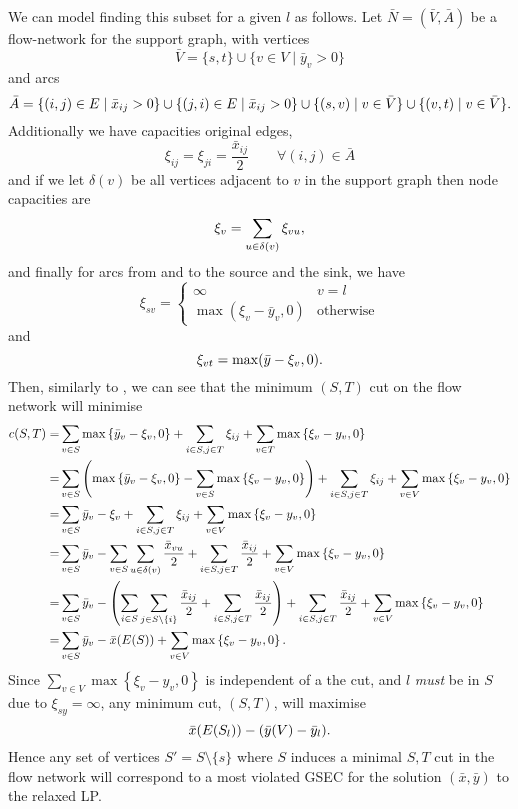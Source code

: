   We can model finding this subset for a given $l$ as follows. Let $\bar{N} = (\bar{V}, \bar{A})$ be a flow-network
  for the support graph, with vertices
  $$\bar V = \{s, t\} \cup \{v \in V \mid \bar y_v > 0 \}$$
  and arcs
  $$\bar A = \{(i, j) \in E \mid \bar x_{ij} > 0 \} \cup \{(j, i) \in E \mid \bar x_{ij} > 0\} \cup \{(s, v) \mid v \in \bar V\} \cup \{(v, t) \mid v \in \bar V\}\mathnormal{.}$$
  Additionally we have capacities original edges,
  $$\xi_{ij} = \xi_{ji} = \frac{\bar x_{ij}}{2} \qquad \forall (i,j) \in \bar A$$
  and if we let $\delta (v)$ be all vertices adjacent to $v$ in the support graph then node capacities are
  $$\xi_v = \sum_{u \in \delta(v)} \xi_{vu}\mathnormal{,}$$
  and finally
  for arcs from and to the source and the sink, we have
  $$\xi_{sv} =
  \begin{cases}
    \infty & v = l \\
    \max(\xi_v - \bar y_v, 0) & \text{otherwise}
  \end{cases}$$
  and
  $$\xi_{vt} = \max(\bar y - \xi_v, 0)\mathnormal{.}$$
  Then, similarly to \citet{padberg1983trees}, we can see that
  the minimum $(S,T)$ cut on the flow network will minimise
  \begin{align*}
    c(S,T) = &\sum_{v \in S} \max \left\{\bar y_v - \xi_v, 0\right\} +
               \sum_{i \in S, j \in T} \xi_{ij} +
               \sum_{v \in T} \max\left\{\xi_v - y_v, 0\right\} \\
    =&\sum_{v \in S} \left( \max \left\{\bar y_v - \xi_v, 0\right\} - \sum_{v \in S} \max\left\{\xi_v - y_v, 0\right\} \right) +
       \sum_{i \in S, j \in T}  \xi_{ij} +
       \sum_{v \in V} \max\left\{\xi_v - y_v, 0\right\} \\
    =&\sum_{v \in S} \bar y_v - \xi_v +
       \sum_{i \in S, j \in T} \xi_{ij} +
       \sum_{v \in V} \max\left\{\xi_v - y_v, 0\right\} \\
    =&\sum_{v \in S} \bar y_v -
       \sum_{v \in S} \sum_{u \in \delta(v)} \frac{\bar x_{vu}}{2} +
       \sum_{i \in S, j \in T} \frac{\bar x_{ij}}{2} +
       \sum_{v \in V} \max\left\{\xi_v - y_v, 0\right\} \\
    =&\sum_{v \in S} \bar y_v -
       \left(\sum_{i \in S} \sum_{j \in S \setminus \{i\}} \frac{\bar x_{ij}}{2} +
       \sum_{i \in S, j \in T} \frac{\bar x_{ij}}{2}\right) +
       \sum_{i \in S, j \in T} \frac{\bar x_{ij}}{2} +
       \sum_{v \in V} \max\left\{\xi_v - y_v, 0\right\} \\
    =&\sum_{v \in S} \bar y_v -
       \bar x (E(S)) +
       \sum_{v \in V} \max\left\{\xi_v - y_v, 0\right\}\mathnormal{.}
  \end{align*}
  Since $\sum_{v \in V} \max\left\{\xi_v - y_v, 0\right\}$ is independent of
  a the cut, and
  $l$ \textit{must} be in $S$ due to $\xi_{sy} = \infty$, any minimum cut, $(S,T)$, will maximise
  $$\bar x (E(S_l)) - (\bar y (V) - \bar y_l)\mathnormal{.}$$
  Hence any set of vertices $S' = S \setminus \{s\}$ where $S$ induces a minimal $S,T$ cut in the flow network will correspond to
  a most violated GSEC for the solution $(\bar x, \bar y)$ to the relaxed LP.

